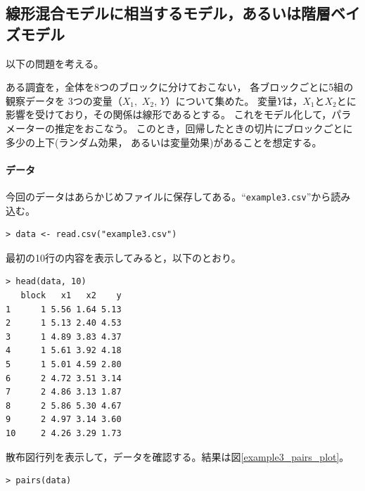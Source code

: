 \documentclass[11pt,uplatex]{jsarticle}
\begin{document}

\subsection{線形混合モデルに相当するモデル，あるいは階層ベイズモデル}
\label{mixed_model}

以下の問題を考える。
\vspace{1zw}

\hspace{18mm}
\begin{minipage}{100mm}
\begin{breakbox}
\noindent
ある調査を，全体を8つのブロックに分けておこない，
各ブロックごとに5組の観察データを
3つの変量（$X_1,$ $X_2$, $Y$）について集めた。
変量$Y$は，$X_1$と$X_2$とに影響を受けており，その関係は線形であるとする。
これをモデル化して，パラメーターの推定をおこなう。
このとき，回帰したときの切片にブロックごとに多少の上下(ランダム効果，
あるいは変量効果)があることを想定する。
\end{breakbox}
\end{minipage}

\vspace{1zw}

\paragraph{データ}
今回のデータはあらかじめファイルに保存してある。``\texttt{example3.csv}''から読み込む。
\begin{lstlisting}
> data <- read.csv("example3.csv")
\end{lstlisting}


最初の10行の内容を表示してみると，以下のとおり。
\begin{lstlisting}
> head(data, 10)
   block   x1   x2    y
1      1 5.56 1.64 5.13
2      1 5.13 2.40 4.53
3      1 4.89 3.83 4.37
4      1 5.61 3.92 4.18
5      1 5.01 4.59 2.80
6      2 4.72 3.51 3.14
7      2 4.86 3.13 1.87
8      2 5.86 5.30 4.67
9      2 4.97 3.14 3.60
10     2 4.26 3.29 1.73
\end{lstlisting}

散布図行列を表示して，データを確認する。結果は図\ref{example3_pairs_plot}。

\begin{lstlisting}
> pairs(data)
\end{lstlisting}
\end{document}
